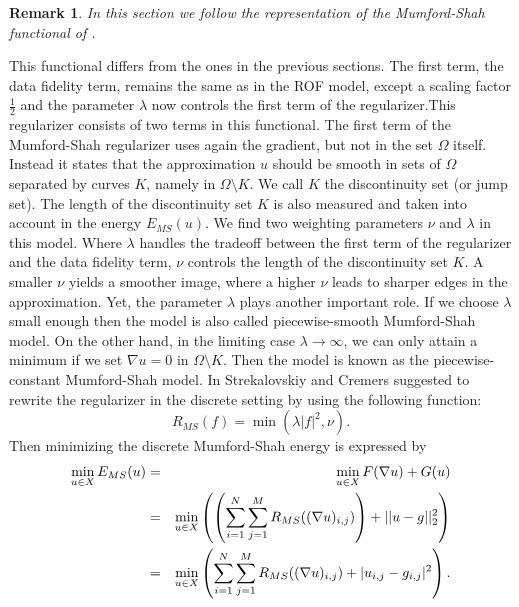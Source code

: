 \documentclass[abstracton]{scrreprt}
\newtheorem{remark}[theorem]{Remark}
\begin{document}
        \begin{remark}
            In this section we follow the representation of the Mumford-Shah functional of \cite{Strekalovskiy-Cremers-eccv14}.
        \end{remark}
        This functional differs from the ones in the previous sections. The first term, the data fidelity term, remains the same as in the ROF model, except a scaling factor $\frac{1}{2}$ and the parameter $\lambda$ now controls the first term of the regularizer.This regularizer consists of two terms in this functional. The first term of the Mumford-Shah regularizer uses again the gradient, but not in the set $\Omega$ itself. Instead it states that the approximation $u$ should be smooth in sets of $\Omega$ separated by curves $K$, namely in $\Omega \setminus K$. We call $K$ the discontinuity set (or jump set). The length of the discontinuity set $K$ is also measured and taken into account in the energy $E_{MS}(u)$. We find two weighting parameters $\nu$ and $\lambda$ in this model. Where $\lambda$ handles the tradeoff between the first term of the regularizer and the data fidelity term, $\nu$ controls the length of the discontinuity set $K$. A smaller $\nu$ yields a smoother image, where a higher $\nu$ leads to sharper edges in the approximation. Yet, the parameter $\lambda$ plays another important role. If we choose $\lambda$ small enough then the model is also called piecewise-smooth Mumford-Shah model. On the other hand, in the limiting case $\lambda \to \infty$, we can only attain a minimum if we set $\nabla u = 0$ in $\Omega \setminus K$. Then the model is known as the piecewise-constant Mumford-Shah model. In \cite{Strekalovskiy-Cremers-eccv14} Strekalovskiy and Cremers suggested to rewrite the regularizer in the discrete setting by using the following function:
            \begin{equation}
                R_{MS}(f) = \min(\lambda |f|^{2},\nu).
            \label{eq:ms_regularizer}
            \end{equation}
        Then minimizing the discrete Mumford-Shah energy is expressed by
            \begin{eqnarray}
                \min_{u \in X} E_{MS}(u) &=& \min_{u \in X} F(\nabla u) + G(u) \notag \\
                &=& \min_{u \in X} \left( \left(\sum_{i = 1}^{N} \sum_{j = 1}^{M} R_{MS}((\nabla u)_{i,j}) \right) + ||u - g||_{2}^{2} \right) \notag \\
                &=& \min_{u \in X} \left(\sum_{i = 1}^{N} \sum_{j = 1}^{M} R_{MS}((\nabla u)_{i,j}) + |u_{i,j} - g_{i,j}|^{2} \right).
            \end{eqnarray}
\end{document}
